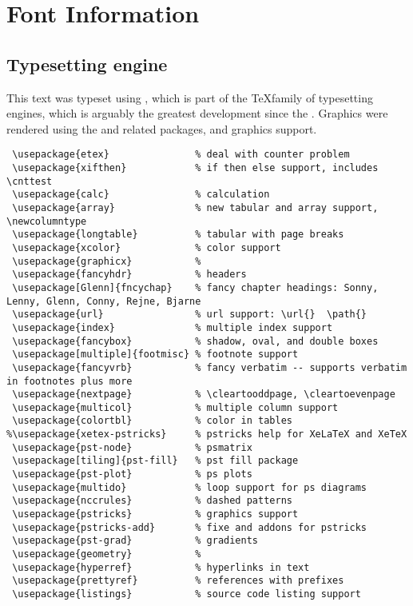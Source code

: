 ﻿%
\chapter{Font Information}
\lstset{language=[LaTeX]TeX}
\section{Typesetting engine}
This text was typeset using \hi{\XeLaTeX},
which is part of the \TeX family of typesetting engines, 
which is arguably the greatest development since the .
Graphics were rendered using the  and related packages, and \hi{\LaTeX} graphics support.
\begin{lstlisting}
 \usepackage{etex}               % deal with counter problem
 \usepackage{xifthen}            % if then else support, includes \cnttest
 \usepackage{calc}               % calculation
 \usepackage{array}              % new tabular and array support, \newcolumntype
 \usepackage{longtable}          % tabular with page breaks
 \usepackage{xcolor}             % color support
 \usepackage{graphicx}           % 
 \usepackage{fancyhdr}           % headers
 \usepackage[Glenn]{fncychap}    % fancy chapter headings: Sonny, Lenny, Glenn, Conny, Rejne, Bjarne
 \usepackage{url}                % url support: \url{}  \path{}
 \usepackage{index}              % multiple index support
 \usepackage{fancybox}           % shadow, oval, and double boxes
 \usepackage[multiple]{footmisc} % footnote support
 \usepackage{fancyvrb}           % fancy verbatim -- supports verbatim in footnotes plus more
 \usepackage{nextpage}           % \cleartooddpage, \cleartoevenpage
 \usepackage{multicol}           % multiple column support
 \usepackage{colortbl}           % color in tables
%\usepackage{xetex-pstricks}     % pstricks help for XeLaTeX and XeTeX
 \usepackage{pst-node}           % psmatrix
 \usepackage[tiling]{pst-fill}   % pst fill package
 \usepackage{pst-plot}           % ps plots
 \usepackage{multido}            % loop support for ps diagrams
 \usepackage{nccrules}           % dashed patterns
 \usepackage{pstricks}           % graphics support
 \usepackage{pstricks-add}       % fixe and addons for pstricks
 \usepackage{pst-grad}           % gradients
 \usepackage{geometry}           %
 \usepackage{hyperref}           % hyperlinks in text
 \usepackage{prettyref}          % references with prefixes
 \usepackage{listings}           % source code listing support
\end{lstlisting}

